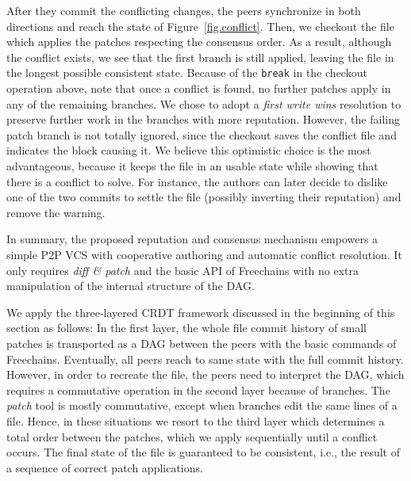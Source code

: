 \documentclass[10pt,journal,compsoc]{IEEEtran}
\newcommand{\FC}       {Freechains\xspace}
\begin{document}
After they commit the conflicting changes, the peers synchronize in both
directions and reach the state of Figure~\ref{fig.conflict}.
Then, we checkout the file which applies the patches respecting the consensus
order.
As a result, although the conflict exists, we see that the first branch is
still applied, leaving the file in the longest possible consistent state.
%
Because of the \texttt{break} in the checkout operation above, note that once a
conflict is found, no further patches apply in any of the remaining branches.
%
We chose to adopt a \emph{first write wins} resolution to preserve further work
in the branches with more reputation.
However, the failing patch branch is not totally ignored, since the checkout
saves the conflict file and indicates the block causing it.
%
We believe this optimistic choice is the most advantageous, because it keeps
the file in an usable state while showing that there is a conflict to solve.
For instance, the authors can later decide to dislike one of the two commits to
settle the file (possibly inverting their reputation) and remove the warning.

In summary, the proposed reputation and consensus mechanism empowers a simple
P2P VCS with cooperative authoring and automatic conflict resolution.
It only requires \emph{diff \& patch} and the basic API of \FC with no extra
manipulation of the internal structure of the DAG.

We apply the three-layered CRDT framework discussed in the beginning of this
section as follows:
In the first layer, the whole file commit history of small patches is
transported as a DAG between the peers with the basic commands of \FC.
Eventually, all peers reach to same state with the full commit history.
However, in order to recreate the file, the peers need to interpret the DAG,
which requires a commutative operation in the second layer because of branches.
The \emph{patch} tool is mostly commutative, except when branches edit the same
lines of a file.
Hence, in these situations we resort to the third layer which determines a
total order between the patches, which we apply sequentially until a conflict
occurs.
The final state of the file is guaranteed to be consistent, i.e., the result of
a sequence of correct patch applications.
\end{document}
